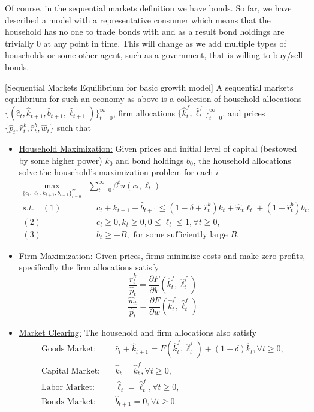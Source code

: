 \documentclass[11pt,english]{article}
\begin{document}
Of course, in the sequential markets definition we have bonds. So far, we have described a model with a representative consumer which means that the household has no one to trade bonds with and as a result bond holdings are trivially $0$ at any point in time. This will change as we add multiple types of households or some other agent, such as a government, that is willing to buy/sell bonds.

\begin{definition}{[Sequential Markets Equilibrium for basic growth model]} A sequential markets equilibrium for such an economy as above is a collection of household allocations $\{( \hat{c}_t, \hat{k}_{t+1}, \hat{b}_{t+1}, \hat{\ell}_{t+1})\}_{t=0}^\infty$, firm allocations $\{\hat{k}_t^f, \hat{\ell}_t^f\}_{t=0}^\infty$, and prices $\{\hat{p}_t, \hat{r}_t^k, \hat{r}^b_t, \hat{w}_t\}$ such that 
\begin{itemize}
\item \underline{Household Maximization:} Given prices and initial level of capital (bestowed by some higher power) $k_0$ and bond holdings $b_0$, the household allocations solve the household's maximization problem for each $i$ \begin{align*}
\max_{\{c_t, \ell_t, k_{t+1}, b_{t+1}\}_{t=0}^\infty} &\sum_{t=0}^\infty \beta^t u(c_t, \ell_t)\\
s.t.\quad  (1)& \quad c_t + k_{t+1} + \hat{b}_{t+1}  \leq (1 - \delta + \hat{r}^k_t)k_t + \hat{w}_t \ell_t +   (1 + \hat{r}_t^b)b_{t},\\
(2)& \quad c_t \geq 0, k_t \geq 0, 0 \leq \ell_t \leq 1,\forall t\geq 0,\\
(3)&\quad b_t \geq -B,\text{ for some sufficiently large } B.
\end{align*}
\item \underline{Firm Maximization:} Given prices, firms minimize costs and make zero profits, specifically the firm allocations satisfy
$$\frac{\hat{r}^k_t}{\hat{p}_t} = \frac{\partial F}{\partial k}(\hat{k}_t^f, \hat{\ell}^f_t)$$
$$\frac{\hat{w}_t}{\hat{p}_t} = \frac{\partial F}{\partial w}(\hat{k}_t^f, \hat{\ell}^f_t)$$

\item \underline{Market Clearing:} The household and firm allocations also satisfy \begin{align*}
\text{Goods Market:}&\quad \hat{c}_t + \hat{k}_{t+1}  = F(\hat{k}_t^f, \hat{\ell}_t^f) + (1 - \delta)\hat{k}_t,\forall t \geq 0,\\
\text{Capital Market:}&\quad \hat{k}_t = \hat{k}_t^f,\forall t \geq 0,\\
\text{Labor Market:}&\quad \hat{\ell}_t = \hat{\ell}_t^f, \forall t \geq 0,\\
\text{Bonds Market:}&\quad \hat{b}_{t+1} = 0 ,\forall t \geq 0.
\end{align*}
\end{itemize}
\end{definition}
\end{document}

